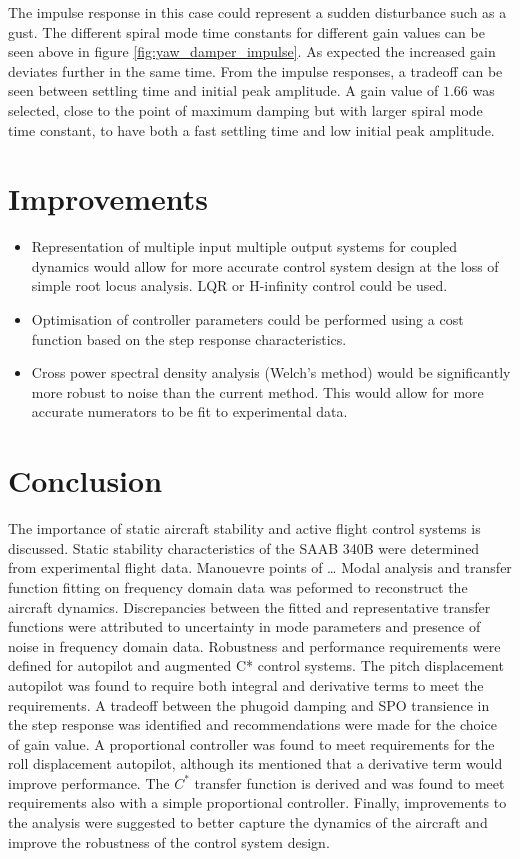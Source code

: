 \documentclass{article}
\begin{document}
The impulse response in this case could represent a sudden disturbance such as a gust.
The different spiral mode time constants for different gain values can be seen above in figure \ref{fig:yaw_damper_impulse}.
As expected the increased gain deviates further in the same time.
From the impulse responses, a tradeoff can be seen between settling time and initial peak amplitude.
A gain value of $1.66$ was selected, close to the point of maximum damping but with larger spiral mode time constant, to have both a fast settling time and low initial peak amplitude.

\section{Improvements}

\begin{itemize}
    \item Representation of multiple input multiple output systems for coupled dynamics would allow for more accurate control system design at the loss of simple root locus analysis. LQR or H-infinity control could be used.
    \item Optimisation of controller parameters could be performed using a cost function based on the step response characteristics.
    \item Cross power spectral density analysis (Welch's method) would be significantly more robust to noise than the current method.
    This would allow for more accurate numerators to be fit to experimental data.
\end{itemize}


\section{Conclusion}

The importance of static aircraft stability and active flight control systems is discussed.
Static stability characteristics of the SAAB 340B were determined from experimental flight data.
Manouevre points of \dots
Modal analysis and transfer function fitting on frequency domain data was peformed to reconstruct the aircraft dynamics.
Discrepancies between the fitted and representative transfer functions were attributed to uncertainty in mode parameters and presence of noise in frequency domain data.
Robustness and performance requirements were defined for autopilot and augmented C* control systems.
The pitch displacement autopilot was found to require both integral and derivative terms to meet the requirements.
A tradeoff between the phugoid damping and SPO transience in the step response was identified and recommendations were made for the choice of gain value.
A proportional controller was found to meet requirements for the roll displacement autopilot, although its mentioned that a derivative term would improve performance.
The $C^*$ transfer function is derived and was found to meet requirements also with a simple proportional controller.
Finally, improvements to the analysis were suggested to better capture the dynamics of the aircraft and improve the robustness of the control system design.
\end{document}
